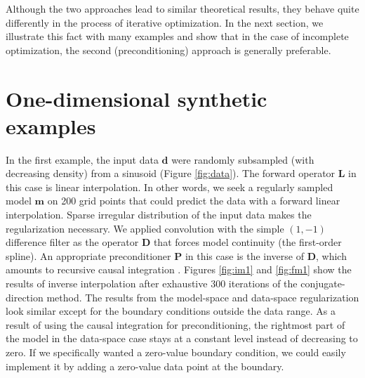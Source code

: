 Although the two approaches lead to similar theoretical results, they
behave quite differently in the process of iterative optimization.  In
the next section, we illustrate this fact with many examples and show
that in the case of incomplete optimization, the second
(preconditioning) approach is generally preferable.

\section{One-dimensional synthetic examples}



In the first example, the input data $\mathbf{d}$ were randomly
subsampled (with decreasing density) from a sinusoid (Figure
\ref{fig:data}). The forward operator $\mathbf{L}$ in this case is
linear interpolation. In other words, we seek a regularly sampled
model $\mathbf{m}$ on 200 grid points that could predict the data with a
forward linear interpolation. Sparse irregular distribution of the
input data makes the regularization necessary.  We applied convolution
with the simple $(1,-1)$ difference filter as the operator $\mathbf{D}$
that forces model continuity (the first-order spline). An appropriate
preconditioner $\mathbf{P}$ in this case is the inverse of $\mathbf{D}$,
which amounts to recursive causal integration \cite[]{gee}. Figures
\ref{fig:im1} and \ref{fig:fm1} show the results of inverse
interpolation after exhaustive 300 iterations of the
conjugate-direction method. The results from the model-space and
data-space regularization look similar except for the boundary
conditions outside the data range.  As a result of using the causal
integration for preconditioning, the rightmost part of the model in
the data-space case stays at a constant level instead of decreasing to
zero. If we specifically wanted a zero-value boundary condition, we
could easily implement it by adding a zero-value data point at the
boundary.



